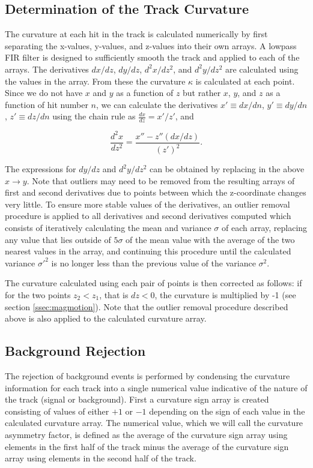 \documentclass{JINST}
\begin{document}
\subsection{Determination of the Track Curvature}\label{ssec:curvature}
The curvature at each hit in the track is calculated numerically by first separating the x-values, y-values, and z-values into their own arrays.  A lowpass FIR filter is designed to sufficiently smooth the track and applied to each of the arrays.  The derivatives $dx/dz$, $dy/dz$, $d^2x/dz^2$, and $d^2y/dz^2$ are calculated using the values in the array.  From these the curvature $\kappa$ is calculated at each point.  Since we do not have $x$ and $y$ as a function of $z$ but rather $x$, $y$, and $z$ as a function of hit number $n$, we can calculate the derivatives $x' \equiv dx/dn$, $y' \equiv dy/dn$, $z' \equiv dz/dn$ using the chain rule as $\frac{dx}{dz} = x'/z'$, and

\begin{equation}
\frac{d^2x}{dz^2} = \frac{x'' - z''(dx/dz)}{(z')^2}.
\end{equation}

The expressions for $dy/dz$ and $d^2y/dz^2$ can be obtained by replacing in the above $x \rightarrow y$.  Note that outliers may need to be removed from the resulting arrays of first and second derivatives due to points between which the z-coordinate changes very little.  To ensure more stable values of the derivatives, an outlier removal procedure is applied to all derivatives and second derivatives computed which consists of iteratively calculating the mean and variance $\sigma$ of each array, replacing any value that lies outside of $5\sigma$ of the mean value with the average of the two nearest values in the array, and continuing this procedure until the calculated variance $\sigma'^2$ is no longer less than the previous value of the variance $\sigma^2$. %

The curvature calculated using each pair of points is then corrected as follows: if for the two points $z_2 < z_1$, that is 
$dz < 0$, the curvature is multiplied by -1 (see section \ref{ssec:magmotion}).  Note that the outlier removal procedure 
described above is also applied to the calculated curvature array.  

\subsection{Background Rejection}
The rejection of background events is performed by condensing the curvature information for each track into a single
numerical value indicative of the nature of the track (signal or background).  First a curvature sign array is created 
consisting of values of either $+1$ or $-1$ depending on the sign of each value in the calculated curvature array.  The 
numerical value, which we will
call the curvature asymmetry factor, is defined as the average of the curvature sign array using elements in the first half of 
the track minus the average of the curvature sign array using elements in the second half of the track.  
\end{document}
